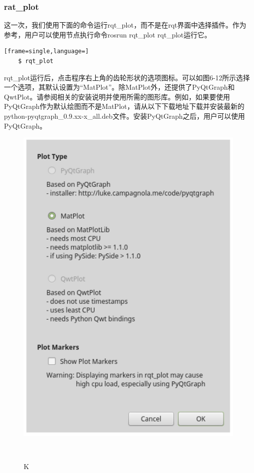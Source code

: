\documentclass[geye,green,kindle,cn]{elegantnote}
\begin{document}
\subsubsection{rat\_plot}
这一次，我们使用下面的命令运行rqt\_plot，而不是在rqt界面中选择插件。作为参考，用户可以使用节点执行命令rosrun rqt\_plot rqt\_plot运行它。 

\begin{lstlisting}[frame=single,language=]
    $ rqt_plot 
\end{lstlisting}

rqt\_plot运行后，点击程序右上角的齿轮形状的选项图标。可以如图6-12所示选择一个选项，其默认设置为“MatPlot”。除MatPlot外，还提供了PyQtGraph和QwtPlot。请参阅相关的安装说明并使用所需的图形库。例如，如果要使用PyQtGraph作为默认绘图而不是MatPlot，请从以下下载地址下载并安装最新的python-pyqtgraph\_0.9.xx-x\_all.deb文件。安装PyQtGraph之后，用户可以使用PyQtGraph。

\begin{figure}[htbp]
    \centering
    \includegraphics[width=0.8\linewidth]{src/K.png}
    \centering
    \caption{K} \label{picture:K}
\end{figure}
\end{document}
